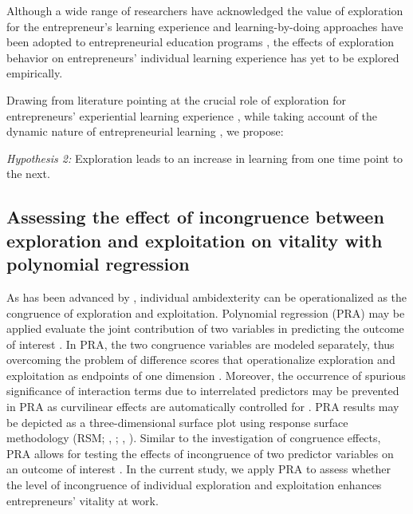\documentclass[man, 12pt, a4paper, noextraspace]{apa6}
\begin{document}
Although a wide range of researchers have acknowledged the value of exploration for the entrepreneur's learning experience and learning-by-doing approaches have been adopted to entrepreneurial education programs \parencite[e.g.,][]{Chang2014, Pittaway2011, Daly2001}, the effects of exploration behavior on entrepreneurs' individual learning experience has yet to be explored empirically. 

Drawing from literature pointing at the crucial role of exploration for entrepreneurs' experiential learning experience \parencite[e.g.,][]{Minniti.2001, Holcomb2009}, while taking account of the dynamic nature of entrepreneurial learning \parencite{Cope.2000}, we propose:

\textit{Hypothesis 2:} Exploration leads to an increase in learning from one time point to the next. 

\subsection{Assessing the effect of incongruence between exploration and exploitation on vitality with polynomial regression}

As has been advanced by \textcite{Rosing.2017}, individual ambidexterity can be operationalized as the congruence of exploration and exploitation.
Polynomial regression (PRA) \parencite[see]{Edwards.1993a} may be applied evaluate the joint contribution of two variables in predicting the outcome of interest \parencite{Edwards.1993a}. 
In PRA, the two congruence variables are modeled separately, thus overcoming the problem of difference scores that operationalize exploration and exploitation as endpoints of one dimension \parencite[e.g.,][]{Keller2015}.
Moreover, the occurrence of spurious significance of interaction terms due to interrelated predictors may be prevented in PRA as curvilinear effects are automatically controlled for \parencite{Cortina1993}. 
PRA results may be depicted as a three-dimensional surface plot \parencite{Edwards.1993a} using response surface methodology (RSM; \citeauthor{Humberg2019}, \citeyear{Humberg2019}; \citeauthor{Shanock.2010b}, \citeyear{Shanock.2010b}). 
Similar to the investigation of congruence effects, PRA allows for testing the effects of incongruence of two predictor variables on an outcome of interest \parencite{Humberg2019}. 
In the current study, we apply PRA to assess whether the level of incongruence of individual exploration and exploitation enhances entrepreneurs' vitality at work. 
\end{document}
